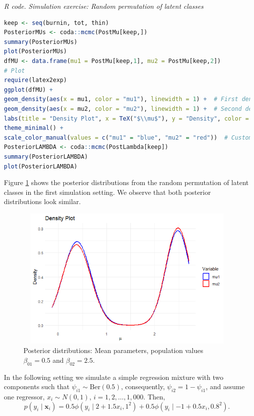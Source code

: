 \begin{tcolorbox}[enhanced,width=4.67in,center upper,
	fontupper=\large\bfseries,drop shadow southwest,sharp corners]
	\textit{R code. Simulation exercise: Random permutation of latent classes}
	\begin{VF}
		\begin{lstlisting}[language=R]
keep <- seq(burnin, tot, thin)
PosteriorMUs <- coda::mcmc(PostMu[keep,])
summary(PosteriorMUs)
plot(PosteriorMUs)
dfMU <- data.frame(mu1 = PostMu[keep,1], mu2 = PostMu[keep,2])
# Plot
require(latex2exp)
ggplot(dfMU) +
geom_density(aes(x = mu1, color = "mu1"), linewidth = 1) +  # First density plot
geom_density(aes(x = mu2, color = "mu2"), linewidth = 1) +  # Second density plot
labs(title = "Density Plot", x = TeX("$\\mu$"), y = "Density", color = "Variable") +
theme_minimal() +
scale_color_manual(values = c("mu1" = "blue", "mu2" = "red"))  # Custom colors
PosteriorLAMBDA <- coda::mcmc(PostLambda[keep])
summary(PosteriorLAMBDA)
plot(PosteriorLAMBDA)
		\end{lstlisting}
	\end{VF}
\end{tcolorbox}

Figure \ref{figMeanPerm} shows the posterior distributions from the random permutation of latent classes in the first simulation setting. We observe that both posterior distributions look similar.

\begin{figure}[!h]
	\includegraphics[width=340pt, height=200pt]{Chapters/chapter11/figures/Permutation.png}
	\caption[List of figure caption goes here]{Posterior distributions: Mean parameters, population values $\beta_{01}=0.5$ and $\beta_{02}=2.5$.}\label{figMeanPerm}
\end{figure}
 
In the following setting we simulate a simple regression mixture with two components such that $\psi_{i1}\sim \text{Ber}(0.5)$, consequently, $\psi_{i2}=1-\psi_{i1}$, and assume one regressor, $x_i\sim N(0,1)$, $i=1,2,\dots,1,000$. Then, 
$$p(y_i \mid \boldsymbol{x}_i) = 
0.5 \phi(y_i \mid 2+1.5x_i,1^2)+0.5 \phi(y_i \mid -1+0.5x_i,0.8^2).$$

